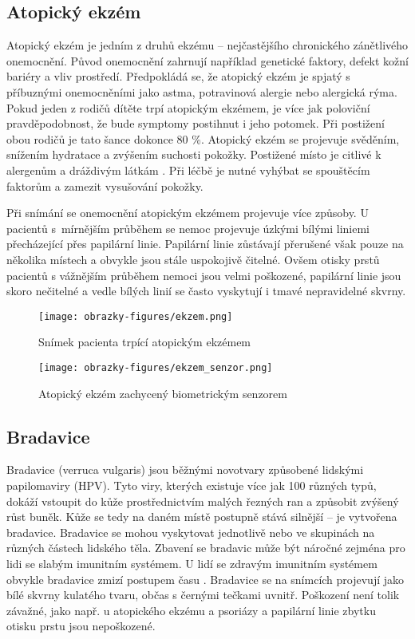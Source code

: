 \subsection*{Atopický ekzém}
Atopický ekzém je jedním z druhů ekzému -- nejčastějšího chronického zánětlivého onemocnění. Původ onemocnění zahrnují například genetické faktory, defekt kožní bariéry a vliv prostředí. Předpokládá se, že atopický ekzém je spjatý s příbuznými onemocněními jako astma, potravinová alergie nebo alergická rýma. Pokud jeden z rodičů dítěte trpí atopickým ekzémem, je více jak poloviční pravděpodobnost, že bude symptomy postihnut i jeho potomek. Při postižení obou rodičů je tato šance dokonce 80 \%. Atopický ekzém se projevuje svěděním, snížením hydratace a zvýšením suchosti pokožky. Postižené místo je citlivé k alergenům a dráždivým látkám \cite{AtopicDermatitis}. Při léčbě je nutné vyhýbat se spouštěcím faktorům a zamezit vysušování pokožky.

Při snímání se onemocnění atopickým ekzémem projevuje více způsoby. U pacientů s~mírnějším průběhem se nemoc projevuje úzkými bílými liniemi přecházející přes papilární linie. Papilární linie zůstávají přerušené však pouze na několika místech a obvykle jsou stále uspokojivě čitelné. Ovšem otisky prstů pacientů s vážnějším průběhem nemoci jsou velmi poškozené, papilární linie jsou skoro nečitelné a vedle bílých linií se často vyskytují i tmavé nepravidelné skvrny.

\begin{figure}[!htbp]
  \begin{minipage}[b]{0.5\linewidth}
    \centering
    \texttt{[image: obrazky-figures/ekzem.png]}
    \caption{Snímek pacienta trpící atopickým ekzémem \cite{Barotova}}
  \end{minipage}
  \hspace{0.5cm}
  \begin{minipage}[b]{0.5\linewidth}
    \centering
    \texttt{[image: obrazky-figures/ekzem\_senzor.png]}
    \caption{Atopický ekzém zachycený biometrickým senzorem \cite{Barotova}}
  \end{minipage}
\end{figure}
\subsection*{Bradavice}
Bradavice (verruca vulgaris) jsou běžnými novotvary způsobené lidskými papilomaviry (HPV). Tyto viry, kterých existuje více jak 100 různých typů, dokáží vstoupit do kůže prostřednictvím malých řezných ran a způsobit zvýšený růst buněk. Kůže se tedy na daném místě postupně stává silnější -- je vytvořena bradavice. Bradavice se mohou vyskytovat jednotlivě nebo ve skupinách na různých částech lidského těla. Zbavení se bradavic může být náročné zejména pro lidi se slabým imunitním systémem. U lidí se zdravým imunitním systémem obvykle bradavice zmizí postupem času \cite{WartsOverview}.  Bradavice se na snímcích projevují jako bílé skvrny kulatého tvaru, občas s černými tečkami uvnitř. Poškození není tolik závažné, jako např. u atopického ekzému a psoriázy a papilární linie zbytku otisku prstu jsou nepoškozené. 

